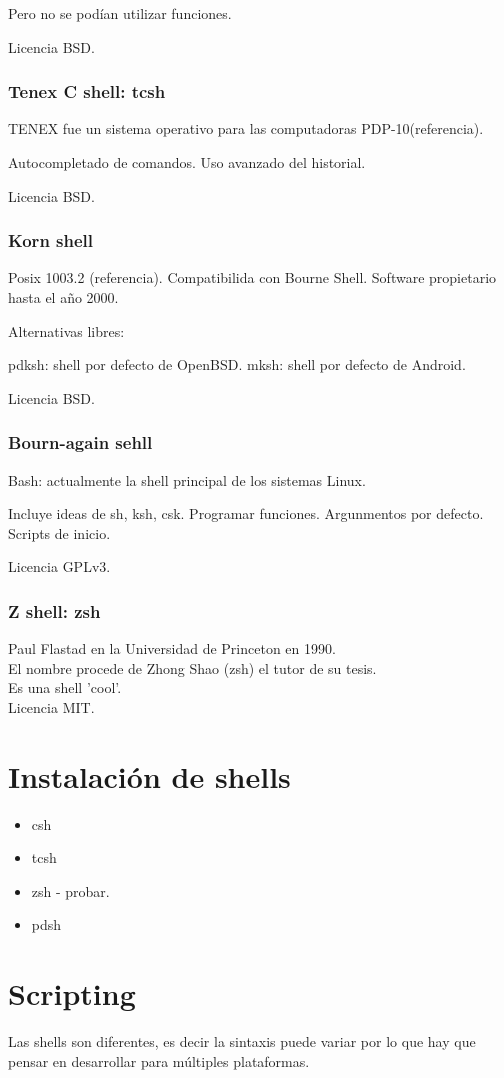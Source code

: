 \documentclass{scrartcl}
\begin{document}
Pero no se pod\'ian utilizar funciones.

Licencia BSD.

\subsubsection{Tenex C shell: tcsh}

TENEX fue un sistema operativo para las computadoras PDP-10(referencia).

Autocompletado de comandos.
Uso avanzado del historial.

Licencia BSD.

\subsubsection{Korn shell}

Posix 1003.2 (referencia).
Compatibilida con Bourne Shell.
Software propietario hasta el a\~no 2000.

Alternativas libres:

pdksh: shell por defecto de OpenBSD.
mksh: shell por defecto de Android.

Licencia BSD.

\subsubsection{Bourn-again sehll}

Bash: actualmente la shell principal de los sistemas Linux.

Incluye ideas de sh, ksh, csk.
Programar funciones.
Argunmentos por defecto.
Scripts de inicio.

Licencia GPLv3.

\subsubsection{Z shell: zsh}

Paul Flastad en la Universidad de Princeton en 1990.\\
El nombre procede de Zhong Shao (zsh) el tutor de su tesis.\\
Es una shell 'cool'.\\
Licencia MIT.

\section{Instalaci\'on de shells}

\begin{itemize}
    \item csh
    \item tcsh
    \item zsh - probar.
    \item pdsh
\end{itemize}

\section{Scripting}

Las shells son diferentes, es decir la sintaxis puede variar por lo que hay que pensar en desarrollar para m\'ultiples plataformas.
\end{document}
